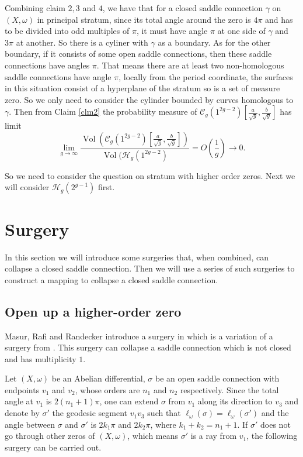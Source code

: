 \documentclass[12pt]{amsart} %
\theoremstyle{definition}
\theoremstyle{remark}
\numberwithin{equation}{section}
\renewcommand\H{{\mathcal H}}
\newcommand{\V}{\operatorname{Vol}}
\begin{document}
Combining claim $2,3$ and $4$, we have that for a closed saddle connection $\gamma$ on $(X,\omega)$ in principal stratum, 
since its total angle around the zero is $4\pi$ and has to be divided into odd multiples of $\pi$, 
it must have angle $\pi$ at one side of $\gamma$ and $3\pi$ at another.
So there is a cyliner with $\gamma$ as a boundary. As for the other boundary, if it consists of some open saddle connections, 
then these saddle connections have angles $\pi$. That means there are at least two non-homologous saddle connections have angle $\pi$, locally from the period coordinate, the surfaces in this situation consist of a hyperplane of the stratum
so is a set of measure zero. 
So we only need to consider the cylinder bounded by curves homologous to $\gamma$.
Then from Claim \ref{clm2} the probability measure of $\mathcal{C}_g(1^{2g-2})[\frac{a}{\sqrt{g}},\frac{b}{\sqrt{g}}]$ has limit
 $$\lim_{g\to \infty}\frac{\V(\mathcal{C}_g(1^{2g-2})[\frac{a}{\sqrt{g}},\frac{b}{\sqrt{g}}])}{\V(\H_g(1^{2g-2})}=O(\frac{1}{g})\to 0.$$

So we need to consider the question on stratum with higher order zeros. Next we will consider $\H_g(2^{g-1})$ first.


\section{Surgery}\label{surgery}
In this section we will introduce some surgeries that, when combined, can collapse a closed saddle connection.
Then we will use a series of such surgeries to construct a mapping to collapse a closed saddle connection.
\subsection{Open up a higher-order zero}
Masur, Rafi and Randecker introduce a surgery in \cite{masur2024lengths} which is a variation of a surgery from \cite{eskin2003moduli}. 
This surgery can collapse a saddle connection which is not closed and has multiplicity $1$. 


Let $(X,\omega)$ be an Abelian differential, $\sigma$ be an open saddle connection with endpoints $v_1$ and $v_2$, 
whose orders are $n_1$ and $n_2$ respectively.
Since the total angle at $v_1$ is $2(n_1+1)\pi$, 
one can extend $\sigma$ from $v_1$ along its direction to $v_3$ and denote by $\sigma'$ the geodesic segment $v_1v_3$ 
such that $\ell_\omega(\sigma)=\ell_\omega(\sigma')$
and the angle between $\sigma$ and $\sigma'$ is
$2k_1\pi$ and $2k_2\pi$, where $k_1+k_2=n_1+1$. 
If $\sigma'$ does not go through other zeros of $(X,\omega)$, 
which means $\sigma'$ is a ray from $v_1$, the following surgery can be carried out.
\end{document}
